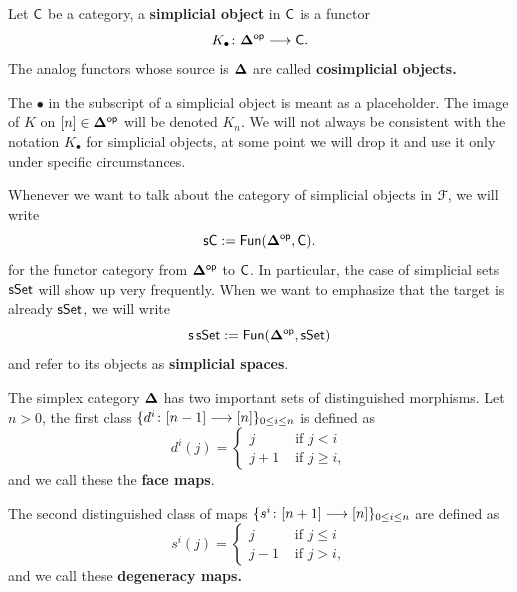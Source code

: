 \begin{definition}\label{ch2:: def: simplicial objects}
    Let $\mathsf C$ be a category, a \textbf{simplicial object} in $\mathsf C$ is a functor 
    \begin{equation}
        K_\bullet \colon \mathbf\Delta^{\mathsf{op}} \longrightarrow \mathsf C.
    \end{equation}
    The analog functors whose source is $\mathbf\Delta$ are called \textbf{cosimplicial objects.}
\end{definition}
\begin{notation}
    The $\bullet$ in the subscript of a simplicial object is meant as a placeholder. The image of $K$ on $[n]\in \mathbf\Delta^{\mathsf{op}}$ will be denoted $K_n$. We will not always be consistent with the notation $K_\bullet$ for simplicial objects, at some point we will drop it and use it only under specific circumstances.
\end{notation}
\begin{notation}
    Whenever we want to talk about the category of simplicial objects in $\mathcal F$, we will write 
    \begin{equation}
        \mathsf{s}\mathsf C := \operatorname{\sf Fun}(\mathbf\Delta^{\mathsf{op}},\mathsf C).
    \end{equation}
    for the functor category from $\mathbf\Delta^{\mathsf{op}}$ to $\mathsf C$. In particular, the case of simplicial sets $\operatorname{\sf sSet}$ will show up very frequently. When we want to emphasize that the target is already $\operatorname{\sf sSet}$, we will write
    \begin{equation}
        \mathsf{s}\operatorname{\sf sSet} := \operatorname{\sf Fun}(\mathbf\Delta^{\mathsf{op}},\operatorname{\sf sSet})
    \end{equation}
    and refer to its objects as \textbf{simplicial spaces}.
\end{notation}



\begin{definition}\label{ch2:: def: face and deg maps}
    The simplex category $\mathbf\Delta$ has two important sets of distinguished morphisms. Let $n>0$, the first class $\{d^{i}\colon [n-1] \longrightarrow [n]\}_{0\leq i \leq n}$ is defined as 
    \begin{equation}
        d^{i}(j) =  
        \begin{cases}
        j & \text{ if } j < i \\
        j + 1 & \text{ if } j \geq i,    
        \end{cases}
    \end{equation} 
    and we call these the \textbf{face maps}.

    The second distinguished class of maps $\{s^{i}\colon [n+1] \longrightarrow [n]\}_{0\leq i \leq n}$ are defined as 
    \begin{equation}
        s^{i}(j) = 
        \begin{cases}
            j & \text{ if } j \leq i \\
            j - 1 & \text{ if } j > i,
        \end{cases}
    \end{equation}
    and we call these \textbf{degeneracy maps.}
\end{definition}

